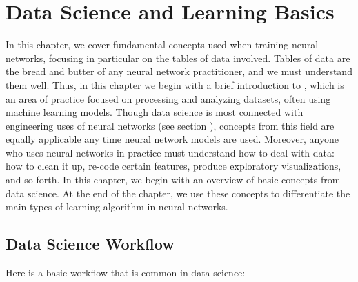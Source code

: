\chapter{Data Science and Learning Basics}\label{ch_data_science}


In this chapter, we cover fundamental concepts used when training neural networks, focusing in particular on the tables of data involved. Tables of data are the bread and butter of any neural network practitioner, and we must understand them well.  Thus, in this chapter we begin with a brief introduction to , which is an area of practice focused on processing and analyzing datasets, often using machine learning models. Though data science is most connected with engineering uses of neural networks (see section ), concepts from this field are equally applicable any time neural network models are used. Moreover, anyone who uses neural networks in practice must understand how to deal with data: how to clean it up, re-code certain features, produce exploratory visualizations, and so forth. In this chapter, we begin with an overview of basic concepts from data science. At the end of the chapter, we use these concepts to differentiate the main types of learning algorithm in neural networks.

\section{Data Science Workflow}

Here is a basic workflow that is common in data science:

